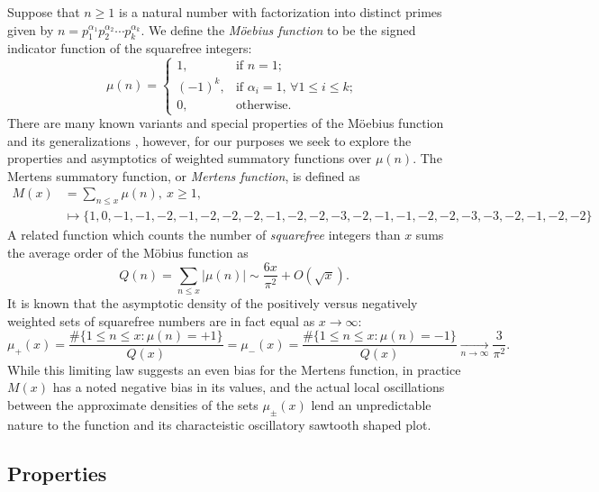 \documentclass[11pt,reqno,a4letter]{article}
\numberwithin{figure}{section}
\numberwithin{table}{section}
\newcommand{\cf}{\textit{cf.\ }}
\newcommand{\seqnum}[1]{\href{http://oeis.org/#1}{\color{ProcessBlue}{\underline{#1}}}}
\theoremstyle{plain}
\numberwithin{theorem}{section}
\theoremstyle{definition}
\begin{document}
Suppose that $n \geq 1$ is a natural number with factorization into 
distinct primes given by 
$n = p_1^{\alpha_1} p_2^{\alpha_2} \cdots p_k^{\alpha_k}$. 
We define the \emph{M\"oebius function} to be the signed indicator function 
of the squarefree integers: 
\[
\mu(n) = \begin{cases} 
     1, & \text{if $n = 1$; } \\ 
     (-1)^k, & \text{if $\alpha_i = 1$, $\forall 1 \leq i \leq k$; } \\ 
     0, & \text{otherwise.} 
     \end{cases} 
\]
There are many known variants and special properties of the M\"oebius function 
and its generalizations \cite[\cf \S 2]{HANDBOOKNT-2004}, however, for our 
purposes we seek to explore the properties and asymptotics of weighted 
summatory functions over $\mu(n)$. 
The Mertens summatory function, or \emph{Mertens function}, is defined as 
\cite[\seqnum{A002321}]{OEIS} 
\begin{align*} 
M(x) & = \sum_{n \leq x} \mu(n),\ x \geq 1, \\ 
     & \longmapsto \{1, 0, -1, -1, -2, -1, -2, -2, -2, -1, -2, -2, -3, -2, 
     -1, -1, -2, -2, -3, -3, -2, -1, -2, -2\}
\end{align*} 
A related function which counts the 
number of \emph{squarefree} integers than $x$ sums the average order of the M\"obius function as 
\cite[\seqnum{A013928}]{OEIS} 
\[ 
Q(n) = \sum_{n \leq x} |\mu(n)| \sim \frac{6x}{\pi^2} + O\left(\sqrt{x}\right). 
\] 
It is known that the asymptotic density of the positively versus negatively 
weighted sets of squarefree numbers are in fact equal as $x \rightarrow \infty$: 
\[
\mu_{+}(x) = \frac{\#\{1 \leq n \leq x: \mu(n) = +1\}}{Q(x)} = 
     \mu_{-}(x) = \frac{\#\{1 \leq n \leq x: \mu(n) = -1\}}{Q(x)} 
     \xrightarrow[n \rightarrow \infty]{} \frac{3}{\pi^2}. 
\]
While this limiting law suggests an even bias for the Mertens function, 
in practice $M(x)$ has a noted negative bias in its values, and the actual 
local oscillations between the approximate densities of the sets 
$\mu_{\pm}(x)$ lend an unpredictable nature to the function and its 
characteistic oscillatory sawtooth shaped plot. 

\subsection{Properties} 
\end{document}

